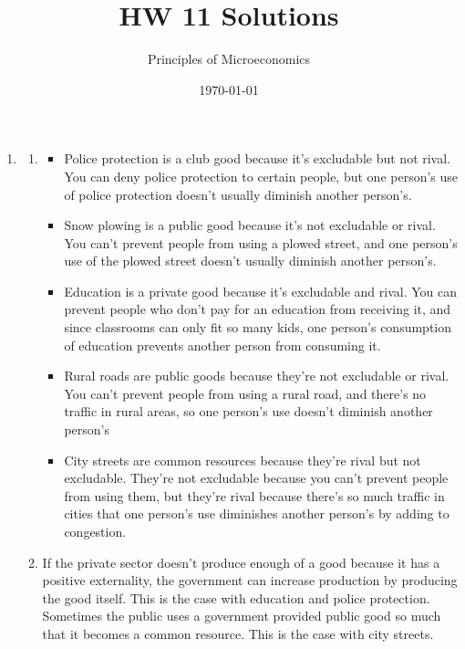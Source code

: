 \documentclass{article}
\title{HW 11 Solutions}
\author{Principles of Microeconomics}
\date{\today}
\begin{document}
\maketitle

\begin{enumerate}

\item

	\begin{enumerate}
	
	\item
	
		\begin{itemize}
		
		\item Police protection is a club good because it’s excludable but not rival. You can deny police protection to certain people, but one person’s use of police protection doesn’t usually diminish another person’s. 
		
		\item Snow plowing is a public good because it’s not excludable or rival. You can’t prevent people from using a plowed street, and one person’s use of the plowed street doesn’t usually diminish another person’s.
		
		\item Education is a private good because it’s excludable and rival. You can prevent people who don’t pay for an education from receiving it, and since classrooms can only fit so many kids, one person’s consumption of education prevents another person from consuming it.
		
		\item Rural roads are public goods because they’re not excludable or rival. You can’t prevent people from using a rural road, and there’s no traffic in rural areas, so one person’s use doesn’t diminish another person’s
		
		\item City streets are common resources because they’re rival but not excludable. They’re not excludable because you can’t prevent people from using them, but they’re rival because there’s so much traffic in cities that one person’s use diminishes another person’s by adding to congestion.
		
		\end{itemize}
	
	\item If the private sector doesn’t produce enough of a good because it has a positive externality, the government can increase production by producing the good itself. This is the case with education and police protection. Sometimes the public uses a government provided public good so much that it becomes a common resource. This is the case with city streets.
	

\end{enumerate}
\end{enumerate}
\end{document}
